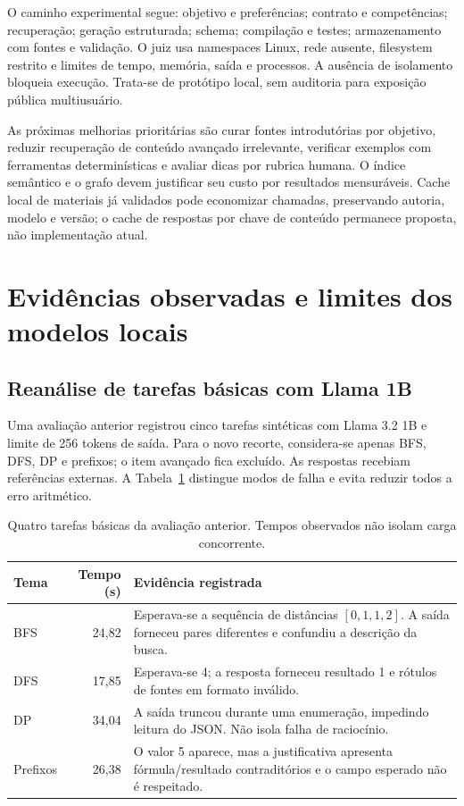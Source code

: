 \documentclass[12pt]{article}
\begin{document}
O caminho experimental segue: objetivo e preferências; contrato e competências; recuperação; geração estruturada; schema; compilação e testes; armazenamento com fontes e validação. O juiz usa namespaces Linux, rede ausente, filesystem restrito e limites de tempo, memória, saída e processos. A ausência de isolamento bloqueia execução. Trata-se de protótipo local, sem auditoria para exposição pública multiusuário.

As próximas melhorias prioritárias são curar fontes introdutórias por objetivo, reduzir recuperação de conteúdo avançado irrelevante, verificar exemplos com ferramentas determinísticas e avaliar dicas por rubrica humana. O índice semântico e o grafo devem justificar seu custo por resultados mensuráveis. Cache local de materiais já validados pode economizar chamadas, preservando autoria, modelo e versão; o cache de respostas por chave de conteúdo permanece proposta, não implementação atual.

\section{Evidências observadas e limites dos modelos locais}
\subsection{Reanálise de tarefas básicas com Llama 1B}
Uma avaliação anterior registrou cinco tarefas sintéticas com Llama 3.2 1B e limite de 256 tokens de saída. Para o novo recorte, considera-se apenas BFS, DFS, DP e prefixos; o item avançado fica excluído. As respostas recebiam referências externas. A Tabela~\ref{tab:local} distingue modos de falha e evita reduzir todos a erro aritmético.

\begin{table}[ht]
\centering\small
\caption{Quatro tarefas básicas da avaliação anterior. Tempos observados não isolam carga concorrente.}\label{tab:local}
\begin{tabularx}{\textwidth}{l r X}
\toprule Tema & Tempo (s) & Evidência registrada \\
\midrule
BFS & 24,82 & Esperava-se a sequência de distâncias $[0,1,1,2]$. A saída forneceu pares diferentes e confundiu a descrição da busca. \\
DFS & 17,85 & Esperava-se 4; a resposta forneceu resultado 1 e rótulos de fontes em formato inválido. \\
DP & 34,04 & A saída truncou durante uma enumeração, impedindo leitura do JSON. Não isola falha de raciocínio. \\
Prefixos & 26,38 & O valor 5 aparece, mas a justificativa apresenta fórmula/resultado contraditórios e o campo esperado não é respeitado. \\
\bottomrule
\end{tabularx}
\end{table}
\end{document}
